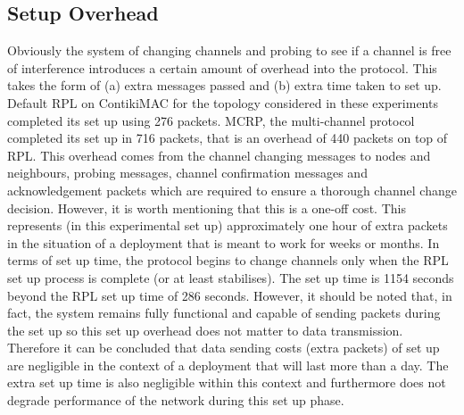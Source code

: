 \subsection{Setup Overhead}
Obviously the system of changing channels and probing to see if a channel is free of interference introduces a certain amount of overhead into
the protocol. This takes the form of (a) extra messages passed and (b) extra time taken to set up. Default RPL on ContikiMAC for the topology considered in these experiments completed its set up using 276 packets. MCRP, the multi-channel protocol completed its set up in 716 packets, that is an overhead of 440 packets on top of RPL. 
This overhead comes from the channel changing messages to nodes and neighbours, probing messages, channel confirmation messages and acknowledgement packets which are required to ensure a thorough channel change decision.
However, it is worth mentioning that this is a one-off cost. This represents (in this experimental set up) approximately one hour of extra packets in the situation of a deployment that is meant to work for weeks or months.  In terms of set up time, the protocol begins to change channels only when the RPL set up process is complete (or at least stabilises). The set up time is 1154 seconds beyond the RPL set up time of 286 seconds. However, it should be noted that, in fact, the system remains fully functional and capable of sending packets during the set up so this set up overhead does not matter to data transmission.
Therefore it can be concluded that data sending costs (extra packets) of set up are negligible in the context of a deployment that will last more than a day. The extra set up time is also negligible within this context and furthermore does not degrade performance of the network during this set up phase.
